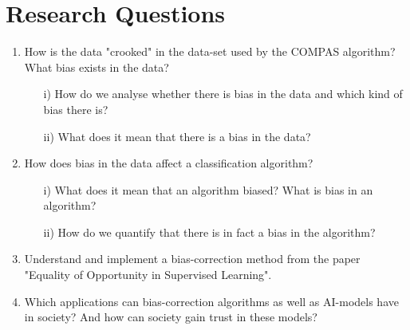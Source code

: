 \documentclass[11pt, fleqn]{article}
\begin{document}
	\vspace*{-0.4cm}
	
	
	\section*{Research Questions}
	\vspace*{-0.2cm}
	\begin{enumerate}
		\item How is the data "crooked" in the data-set used by the COMPAS algorithm? What bias exists in the data?
		\begin{itemize}
			\item[i)] How do we analyse whether there is bias in the data and which kind of bias there is? 
			\item[ii)] What does it mean that there is a bias in the data?
		\end{itemize}
		
		\item How does bias in the data affect a classification algorithm?
		\begin{itemize}
			\item[i)] What does it mean that an algorithm biased? What is bias in an algorithm?
			\item[ii)] How do we quantify that there is in fact a bias in the algorithm?
		\end{itemize}
		
		\item Understand and implement a bias-correction method from the paper "Equality of Opportunity in Supervised Learning". 
		
		\item Which applications can bias-correction algorithms as well as AI-models have in society? And how can society gain trust in these models? 
		
		
	\end{enumerate}
	
\end{document}
